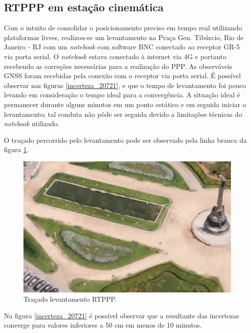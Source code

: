 \subsection{RTPPP em estação cinemática}

Com o intuito de consolidar o posicionamento preciso em tempo real utilizando plataformas livres, realizou-se um levantamento na Praça Gen. Tibúrcio, Rio de Janeiro - RJ com um \textit{notebook} com software BNC conectado ao receptor GR-5 via porta serial. O \textit{notebook} estava conectado à internet via 4G e portanto recebendo as correções necessárias para a realização do PPP. As observáveis GNSS foram recebidas pela conexão com o receptor via porta serial. É possível observar nas figuras \ref{incerteza_20721}, \label{comp_xyz_20721} e \label{comp_norma_20721} que o tempo de levantamento foi pouco levando em consideração o tempo ideal para a convergência. A situação ideal é permanecer durante alguns minutos em um ponto estático e em seguida iniciar o levantamento; tal conduta não pôde ser seguida devido a limitações técnicas do \textit{notebook} utilizado. 

O traçado percorrido pelo levantamento pode ser observado pela linha branca da figura \ref{rtppp_praca}.

\begin{figure}[H]
\centering
\includegraphics[scale=0.6]{pfc_pdf_files/img/rtppp_praca.jpeg}
\caption{Traçado levantamento RTPPP.}
\label{rtppp_praca}
\end{figure}

Na figura \ref{incerteza_20721} é possível observar que a resultante das incertezas converge para valores inferiores a 50 cm em menos de 10 minutos.

